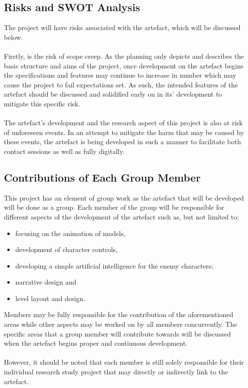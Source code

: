 \subsection{Risks and SWOT Analysis}
The project will have risks associated with the artefact, which will be discussed below.
\\\\
Firstly, is the risk of scope creep. As the planning only depicts and describes the basic structure and aims of the project, once development on the artefact begins the specifications and features may continue to increase in number which may cause the project to fail expectations set. As such, the intended features of the artefact should be discussed and solidified early on in its’ development to mitigate this specific risk.
\\\\
The artefact’s development and the research aspect of this project is also at risk of unforeseen events. In an attempt to mitigate the harm that may be caused by these events, the artefact is being developed in such a manner to facilitate both contact sessions as well as fully digitally.


\subsection{Contributions of Each Group Member}
This project has an element of group work as the artefact that will be developed will be done as a group. Each member of the group will be responsible for different aspects of the development of the artefact such as, but not limited to;
\begin{itemize}
\item focusing on the animation of models, 
\item development of character controls, 
\item developing a simple artificial intelligence for the enemy characters;
\item narrative design and 
\item level layout and design. 
\end{itemize}
Members may be fully responsible for the contribution of the aforementioned areas while other aspects may be worked on by all members concurrently. The specific areas that a group member will contribute towards will be discussed when the artefact begins proper and continuous development.
\\\\
However, it should be noted that each member is still solely responsible for their individual research study project that may directly or indirectly link to the artefact.



